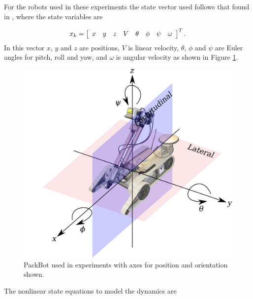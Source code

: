 For the robots used in these experiments the state vector used follows that found in \cite{Kelly_1994_338}, \cite{Kelly_1994_333} where the state variables are

\begin{align*}
x_k = \left[\begin{array}{c c c c c c c c} x & y & z & V & \theta & \phi & \psi & \omega \end{array}\right]^T.
\end{align*}
In this vector $x$, $y$ and $z$ are positions, $V$ is linear velocity, $\theta$, $\phi$ and $\psi$ are Euler angles for pitch, roll and yaw, and $\omega$ is angular velocity as shown in Figure \ref{fig:robotaxes}.

\begin{figure}[ht!]
    \centering
    \includegraphics[width=.75\textwidth]{images/packbotaxes}
    \caption{PackBot used in experiments with axes for position and orientation shown.}
    \label{fig:robotaxes}
\end{figure}

The nonlinear state equations to model the dynamics are

